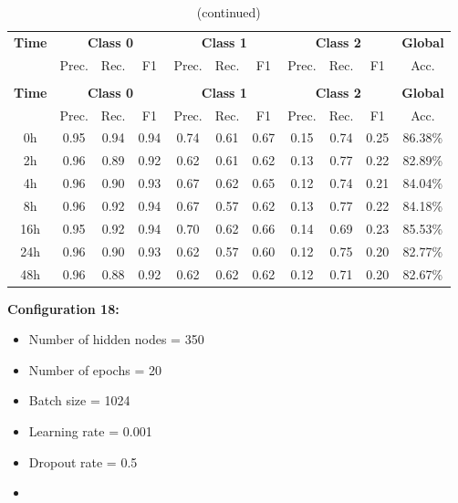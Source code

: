 \documentclass[12pt,oneside]{book} %
\begin{document}
\setlength\LTleft{1cm}
\begin{longtable}{ c ccc ccc ccc c}
\caption{Performance metrics of the LNN model for configuration 17} \\
\toprule
\textbf{Time} & \multicolumn{3}{c}{\textbf{Class 0}} & \multicolumn{3}{c}{\textbf{Class 1}} & \multicolumn{3}{c}{\textbf{Class 2}} & \textbf{Global} \\
               & Prec. & Rec. & F1  & Prec. & Rec. & F1   & Prec. & Rec. & F1  & Acc. \\
\midrule
\endfirsthead

\caption[]{(continued)} \\
\toprule
\textbf{Time} & \multicolumn{3}{c}{\textbf{Class 0}} & \multicolumn{3}{c}{\textbf{Class 1}} & \multicolumn{3}{c}{\textbf{Class 2}} & \textbf{Global} \\
               & Prec. & Rec. & F1  & Prec. & Rec. & F1   & Prec. & Rec. & F1  & Acc. \\
\midrule
\endhead

\bottomrule
\endfoot

\bottomrule
\endlastfoot

0h   & 0.95  & 0.94 & 0.94 & 0.74  & 0.61 & 0.67  & 0.15  & 0.74 & 0.25 & 86.38\% \\
2h   & 0.96  & 0.89 & 0.92 & 0.62  & 0.61 & 0.62  & 0.13  & 0.77 & 0.22 & 82.89\% \\
4h   & 0.96  & 0.90 & 0.93 & 0.67  & 0.62 & 0.65  & 0.12  & 0.74 & 0.21 & 84.04\% \\
8h   & 0.96  & 0.92 & 0.94 & 0.67  & 0.57 & 0.62  & 0.13  & 0.77 & 0.22 & 84.18\% \\
16h  & 0.95  & 0.92 & 0.94 & 0.70  & 0.62 & 0.66  & 0.14  & 0.69 & 0.23 & 85.53\% \\
24h  & 0.96  & 0.90 & 0.93 & 0.62  & 0.57 & 0.60  & 0.12  & 0.75 & 0.20 & 82.77\% \\
48h  & 0.96  & 0.88 & 0.92 & 0.62  & 0.62 & 0.62  & 0.12  & 0.71 & 0.20 & 82.67\% \\
\end{longtable}

\noindent \textbf{Configuration 18:}
\begin{multicols}{2}
    \begin{itemize}
        \item Number of hidden nodes = 350
        \item Number of epochs = 20
        \item Batch size = 1024
    \end{itemize}
    \begin{itemize}
         \item Learning rate = 0.001
         \item Dropout rate  = 0.5
         \item[\hspace{0pt}]
    \end{itemize}
\end{multicols}
\end{document}
